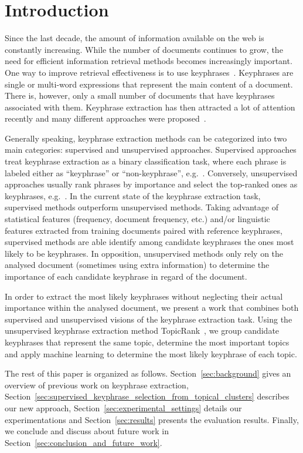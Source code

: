 \section{Introduction}
\label{sec:introduction}
  Since the last decade, the amount of information available on the web is
  constantly increasing. While the number of documents continues to grow, the
  need for efficient information retrieval methods becomes increasingly
  important. One way to improve retrieval effectiveness is to use
  keyphrases~\cite{jones1999phrasier}. Keyphrases are single or multi-word
  expressions that represent the main content of a document. There is, however,
  only a small number of documents that have keyphrases associated with them.
  Keyphrase extraction has then attracted a lot of attention recently and many
  different approaches were proposed~\cite{hasan2014state_of_the_art}.

  Generally speaking, keyphrase extraction methods can be categorized into two
  main categories: supervised and unsupervised approaches. Supervised approaches
  treat keyphrase extraction as a binary classification task, where each phrase
  is labeled either as ``keyphrase'' or ``non-keyphrase'',
  e.g.~\cite{witten1999kea}. Conversely, unsupervised approaches usually rank
  phrases by importance and select the top-ranked ones as keyphrases,
  e.g.~\cite{mihalcea2004textrank}.
  In the current state of the keyphrase extraction task, supervised methods
  outperform unsupervised methods. Taking advantage of statistical features
  (frequency, document frequency, etc.) and/or linguistic features extracted
  from training documents paired with reference keyphrases, supervised methods
  are able identify among candidate keyphrases the ones most likely to be
  keyphrases. In opposition, unsupervised methods only rely on the analysed
  document (sometimes using extra information) to determine the importance of
  each candidate keyphrase in regard of the document.

  In order to extract the most likely keyphrases without neglecting their actual
  importance within the analysed document, we present a work that combines both
  supervised and unsupervised visions of the keyphrase extraction task. Using
  the unsupervised keyphrase extraction method
  Topic\-Rank~\cite{bougouin2013topicrank}, we group candidate keyphrases that
  represent the same topic, determine the most important topics and apply
  machine learning to determine the most likely keyphrase of each topic.

  The rest of this paper is organized as follows. Section~\ref{sec:background}
  gives an overview of previous work on keyphrase extraction,
  Section~\ref{sec:supervised_keyphrase_selection_from_topical_clusters}
  describes our new approach, Section~\ref{sec:experimental_settings} details
  our experimentations and Section~\ref{sec:results} presents the evaluation
  results. Finally, we conclude and discuss about future work in
  Section~\ref{sec:conclusion_and_future_work}.

